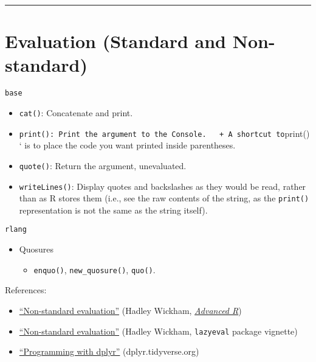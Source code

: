 \documentclass[
]{book}
\providecommand{\tightlist}{%
  \setlength{\itemsep}{0pt}\setlength{\parskip}{0pt}}
\begin{document}
\begin{center}\rule{0.5\linewidth}{0.5pt}\end{center}

\hypertarget{evaluation-standard-and-non-standard}{%
\section{Evaluation (Standard and Non-standard)}\label{evaluation-standard-and-non-standard}}

\texttt{base}

\begin{itemize}
\tightlist
\item
  \texttt{cat()}: Concatenate and print.
\item
  \texttt{print():\ Print\ the\ argument\ to\ the\ Console.\ \ \ +\ A\ shortcut\ to}print()` is to place the code you want printed inside parentheses.
\item
  \texttt{quote()}: Return the argument, unevaluated.
\item
  \texttt{writeLines()}: Display quotes and backslashes as they would be read, rather than as R stores them (i.e., see the raw contents of the string, as the \texttt{print()} representation is not the same as the string itself).
\end{itemize}

\texttt{rlang}

\begin{itemize}
\tightlist
\item
  Quosures

  \begin{itemize}
  \tightlist
  \item
    \texttt{enquo()}, \texttt{new\_quosure()}, \texttt{quo()}.
  \end{itemize}
\end{itemize}

References:

\begin{itemize}
\tightlist
\item
  \href{http://adv-r.had.co.nz/Computing-on-the-language.html}{``Non-standard evaluation''} (Hadley Wickham, \href{http://adv-r.had.co.nz/}{\emph{Advanced R}})
\item
  \href{https://cran.r-project.org/web/packages/lazyeval/vignettes/lazyeval.html}{``Non-standard evaluation''} (Hadley Wickham, \texttt{lazyeval} package vignette)
\item
  \href{https://dplyr.tidyverse.org/articles/programming.html}{``Programming with dplyr''} (dplyr.tidyverse.org)
\end{itemize}
\end{document}
